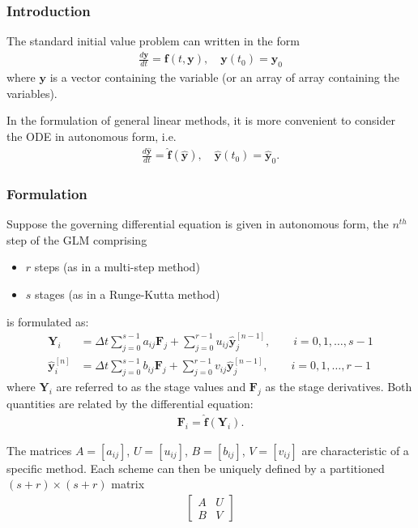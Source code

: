 \subsubsection{Introduction}
The standard initial value problem can written in the form
\begin{align*}
\frac{d\boldsymbol{y}}{dt} = \boldsymbol{f}(t,\boldsymbol{y}),\quad
\boldsymbol{y}(t_0)=\boldsymbol{y}_0
\end{align*}
where $\boldsymbol{y}$ is a vector containing the variable (or an
array of array containing the variables).

In the formulation of general linear methods, it is more convenient to consider
the ODE in autonomous form, i.e.
\begin{align*}
\frac{d\boldsymbol{\hat{y}}}{dt}=\boldsymbol{\hat{f}}(\boldsymbol{\hat{y}}),\quad
\boldsymbol{\hat{y}}(t_0)= \boldsymbol{\hat{y}}_0.
\end{align*}

\subsubsection{Formulation}
Suppose the governing differential equation is given in autonomous form, the
$n^{th}$ step of the GLM comprising
\begin{itemize}
\item $r$ steps (as in a multi-step method)
\item $s$ stages (as in a Runge-Kutta method)
\end{itemize}
is formulated as:
\begin{align*}
\boldsymbol{Y}_i &= \Delta
t\sum_{j=0}^{s-1}a_{ij}\boldsymbol{F}_j+\sum_{j=0}^{r-1}u_{ij}\boldsymbol{\hat{y}}_{j}^{[n-1]},
\qquad i=0,1,\ldots,s-1 \\
\boldsymbol{\hat{y}}_{i}^{[n]}&=\Delta
t\sum_{j=0}^{s-1}b_{ij}\boldsymbol{F}_j+\sum_{j=0}^{r-1}v_{ij}
\boldsymbol{\hat{y}}_{j}^{[n-1]}, \qquad i=0,1,\ldots,r-1
\end{align*}
where $\boldsymbol{Y}_i$ are referred to as the stage values and
$\boldsymbol{F}_j$ as the stage derivatives. Both quantities are
related by the differential equation:
\begin{align*}
\boldsymbol{F}_i = \boldsymbol{\hat{f}}(\boldsymbol{Y}_i).
\end{align*}

The matrices $A=[a_{ij}]$, $U=[u_{ij}]$,
$B=[b_{ij}]$, $V=[v_{ij}]$ are characteristic of a
specific method. Each scheme can then be uniquely defined by a partitioned
$(s+r)\times(s+r)$ matrix
\begin{align*}
\left[
\begin{array}{cc}
  A & U\\
  B & V \end{array}\right]
\end{align*}


